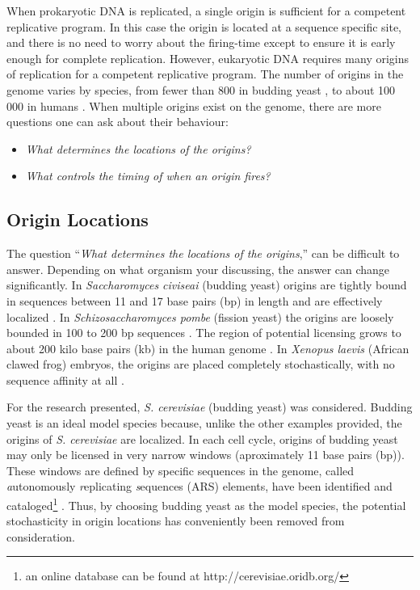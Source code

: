 	When prokaryotic DNA is replicated, a single origin is sufficient for a competent replicative program.
	In this case the origin is located at a sequence specific site, and there is no need to worry about the firing-time except to ensure it is early enough for complete replication.
	However, eukaryotic DNA requires many origins of replication for a competent replicative program.
	The number of origins in the genome varies by species, from fewer than 800 in budding yeast \cite{OriDB}, to about 100 000 in humans \cite{OriginsReview}.
	When multiple origins exist on the genome, there are more questions one can ask about their behaviour:
	\begin{itemize}
		\item \emph{What determines the locations of the origins?}
		\item \emph{What controls the timing of when an origin fires?}
	\end{itemize}
	
		\subsection{Origin Locations}
		
		The question ``\emph{What determines the locations of the origins},'' can be difficult to answer.
		Depending on what organism your discussing, the answer can change significantly.
		In \emph{Saccharomyces civiseai} (budding yeast) origins are tightly bound in sequences between 11 and 17 base pairs (bp) in length and are effectively localized \cite{ScottsPaper}.
		In \emph{Schizosaccharomyces pombe} (fission yeast) the origins are loosely bounded in 100 to 200 bp sequences \cite{OriginsReview}.
		The region of potential licensing grows to about 200 kilo base pairs (kb) in the human genome \cite{HumanGenome}.
		In \emph{Xenopus laevis} (African clawed frog) embryos, the origins are placed completely stochastically, with no sequence affinity at all \cite{FrogEmbryo}.
		
		For the research presented, \emph{S. cerevisiae} (budding yeast) was considered.
		Budding yeast is an ideal model species because, unlike the other examples provided, the origins of \emph{S. cerevisiae} are localized.
		In each cell cycle, origins of budding yeast may only be licensed in very narrow windows (aproximately 11 base pairs (bp)).
		These windows are defined by specific sequences in the genome, called \emph{a}utonomously \emph{r}eplicating \emph{s}equences (ARS) elements, have been identified and cataloged\footnote{an online database can be found at http://cerevisiae.oridb.org/} \cite{OriDB}.
		Thus, by choosing budding yeast as the model species, the potential stochasticity in origin locations has conveniently been removed from consideration.
		
